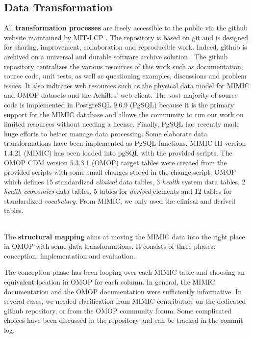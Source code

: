 %
%
\subsection{Data Transformation}

%

All \textbf{transformation processes} are freely accessible to the public via
the github website \cite{mimic-omop-website} maintained by MIT-LCP
\cite{mimic-nature}. The repository is based on git and is designed for
sharing, improvement, collaboration and reproducible work. Indeed, github is
archived on a universal and durable software archive solution
\cite{universal-archive}. The github repository centralizes the various
resources of this work such as documentation, source code, unit tests, as well
as questioning examples, discussions and problem issues.  It also indicates web
resources such as the physical data model for MIMIC\cite{mimic-schemaspy} and
OMOP\cite{omop-schemaspy} datasets and the Achilles' web
client\cite{mimic-omop-achilles}.
The vast majority of source code is implemented in PostgreSQL 9.6.9 (PgSQL) 
because it is the primary support for the MIMIC database and allows the community 
to run our work on limited resources without needing a license. 
Finally, PgSQL has recently made huge efforts to better manage data processing. 
Some elaborate data transformations have been implemented as PgSQL functions.
MIMIC-III version 1.4.21 (MIMIC) has been loaded into pgSQL with the provided
scripts. The OMOP CDM version 5.3.3.1 (OMOP) target tables were created from
the provided scripts with some small changes stored in the change script. OMOP
which defines 15 standardized \textit{clinical} data tables, 3 \textit{health}
system data tables, 2 \textit{health economics} data tables, 5 tables for
\textit{derived} elements and 12 tables for standardized \textit{vocabulary}.
From MIMIC, we only used the clinical and derived tables. 


\\

The \textbf{structural mapping} aims at moving the MIMIC data into the right
place in OMOP with some data transformations. It consists of three
phases: conception, implementation and evaluation.

The conception phase has been looping over each MIMIC table and choosing an
equivalent location in OMOP for each column. In general, the MIMIC
documentation and the OMOP documentation were sufficiently informative. In
several cases, we needed clarification from MIMIC contributors on the dedicated
github repository, or from the OMOP community forum. Some complicated choices
have been discussed in the repository \cite{mimic-omop-github} and can be
tracked in the commit log.

